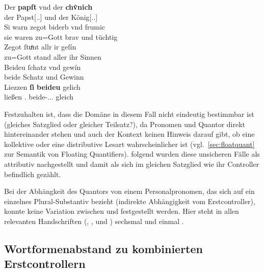 \begin{exe}
\ex\label{ex:papstkoenig4} %
	\gll Der \textbf{papſt} vnd der \textbf{chv̂nich} \\
		der Papst[\Nom.\Sg.\MascM] und der König[\Nom.\Sg.\MascM] \\
\sn \gll Si warn zegot biderb vnd frumic \\
		sie waren {zu=Gott} brav und tüchtig \\
\sn \gll Zegot ſtuͦnt allr ir geſín \\
		{zu=Gott} stand aller ihr Sinnen \\
\sn \gll Beideu ſchatz vnd gewín \\
		beide Schatz und Gewinn \\
\sn \gll Liezzen \textbf{ſi} \textbf{beideu} gelich \\
		ließen \Tpl\subM.\Nom{} beide-\Nom.\Pl.\NeutM.\St{} gleich \\
	\begin{taggedline}{\parencites[\pno~17\vb, 30--34]{kc:B1}[vgl. abweichend][6110--6113]{schroeder1895}}
	\trans {}
	\end{taggedline}
\end{exe}

Festzuhalten ist, dass die Domäne in diesem Fall nicht eindeutig bestimmbar ist
(gleiches Satzglied oder gleicher Teilsatz?), da Pronomen und Quantor direkt
hintereinander stehen und auch der Kontext keinen Hinweis darauf gibt, ob eine
kollektive oder eine distributive Lesart wahrscheinlicher ist
(vgl.~\cref{sec:floatquant} zur Semantik von Floating Quantifiers).
\citet[623]{ksw2} folgend wurden diese unsicheren Fälle als attributiv
nachgestellt und damit als sich im gleichen Satzglied wie ihr Controller
befindlich gezählt.

Bei der Abhängkeit des Quantors von einem Personalpronomen, das sich auf ein
einzelnes Plural-Substantiv bezieht (indirekte Abhängigkeit vom
Erstcontroller), konnte keine Variation zwischen  und 
festgestellt werden. Hier steht in allen relevanten Handschriften
(\citet{kc:B1}, \citet{kc:C1}, \citet{kc:K} und \citet{kc:VB}) sechsmal
 und einmal  \autocites(zu insgesamt vier
Stellen)[\pno~31\va, 30--31]{kc:B1}.

\subsection{Wortformenabstand zu kombinierten Erstcontrollern}

